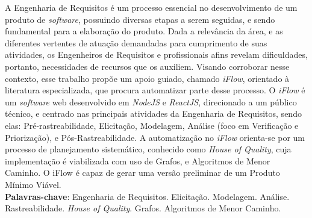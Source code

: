 \begin{resumo}
    A Engenharia de Requisitos é um processo essencial no desenvolvimento de um produto de \textit{software}, possuindo diversas etapas a serem seguidas, e sendo fundamental para a elaboração do produto. Dada a relevância da área, e as diferentes vertentes de atuação demandadas para cumprimento de suas atividades, os Engenheiros de Requisitos e profissionais afins revelam dificuldades, portanto, necessidades de recursos que os auxiliem. Visando corroborar nesse contexto, esse trabalho propõe um apoio guiado, chamado \textit{iFlow}, orientado à literatura especializada, que procura automatizar parte desse processo. O \textit{iFlow} é um \textit{software} web desenvolvido em \textit{NodeJS} e \textit{ReactJS}, direcionado a um público técnico, e centrado nas principais atividades da Engenharia de Requisitos, sendo elas: Pré-rastreabilidade, Elicitação, Modelagem, Análise (foco em Verificação e Priorização), e Pós-Rastreabilidade. A automatização no \textit{iFlow} orienta-se por um processo de planejamento sistemático, conhecido como \textit{House of Quality}, cuja implementação é viabilizada com uso de Grafos, e Algoritmos de Menor Caminho. O iFlow é capaz de gerar uma versão preliminar de um Produto Mínimo Viável.
    \vspace{\onelineskip}
    \noindent
    \\
    \textbf{Palavras-chave}: Engenharia de Requisitos. Elicitação. Modelagem. Análise. Rastreabilidade. \textit{House of Quality}. Grafos. Algoritmos de Menor Caminho.
\end{resumo}
